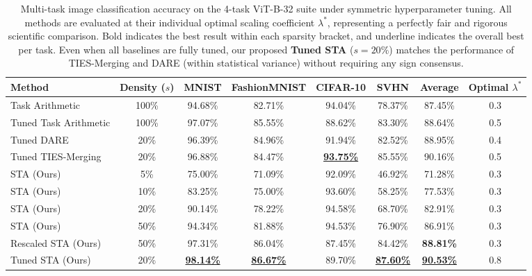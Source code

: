 \begin{table}[t]
\centering
\caption{Multi-task image classification accuracy on the 4-task ViT-B-32 suite under symmetric hyperparameter tuning. All methods are evaluated at their individual optimal scaling coefficient $\lambda^*$, representing a perfectly fair and rigorous scientific comparison. Bold indicates the best result within each sparsity bracket, and underline indicates the overall best per task. Even when all baselines are fully tuned, our proposed \textbf{Tuned STA} ($s=20\%$) matches the performance of TIES-Merging and DARE (within statistical variance) without requiring any sign consensus.}
\label{tab:main_results}
\vskip 0.15in
\begin{small}
\begin{sc}
\begin{tabular}{lccccccc}
\toprule
Method & Density ($s$) & MNIST & FashionMNIST & CIFAR-10 & SVHN & Average & Optimal $\lambda^*$ \\
\midrule
Task Arithmetic & 100\% & 94.68\% & 82.71\% & 94.04\% & 78.37\% & 87.45\% & 0.3 \\
Tuned Task Arithmetic & 100\% & 97.07\% & 85.55\% & 88.62\% & 83.30\% & 88.64\% & 0.5 \\
Tuned DARE & 20\% & 96.39\% & 84.96\% & 91.94\% & 82.52\% & 88.95\% & 0.4 \\
Tuned TIES-Merging & 20\% & 96.88\% & 84.47\% & \underline{\textbf{93.75\%}} & 85.55\% & 90.16\% & 0.5 \\
\midrule
STA (Ours) & 5\% & 75.00\% & 71.09\% & 92.09\% & 46.92\% & 71.28\% & 0.3 \\
STA (Ours) & 10\% & 83.25\% & 75.00\% & 93.60\% & 58.25\% & 77.53\% & 0.3 \\
STA (Ours) & 20\% & 90.14\% & 78.22\% & 94.58\% & 68.70\% & 82.91\% & 0.3 \\
STA (Ours) & 50\% & 94.34\% & 81.88\% & 94.53\% & 76.90\% & 86.91\% & 0.3 \\
\midrule
Rescaled STA (Ours) & 50\% & 97.31\% & 86.04\% & 87.45\% & 84.42\% & \textbf{88.81\%} & 0.3 \\
Tuned STA (Ours) & 20\% & \underline{\textbf{98.14\%}} & \underline{\textbf{86.67\%}} & 89.70\% & \underline{\textbf{87.60\%}} & \underline{\textbf{90.53\%}} & 0.8 \\
\bottomrule
\end{tabular}
\end{sc}
\end{small}
\vskip -0.1in
\end{table}

